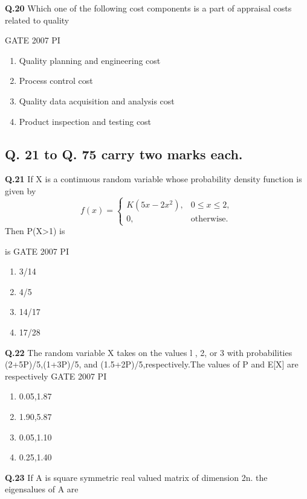 \documentclass[journal,12pt,onecolumn]{exam}
\theoremstyle{remark}
\begin{document}
            \noindent
            \textbf{Q.20}
            Which one of the following cost components is a part of appraisal costs related to quality


            \hfill{GATE 2007 PI}
            \begin{enumerate}
                \item Quality planning and engineering cost
                \item Process control cost
            
                 \item Quality data acquisition and analysis cost
                 \item Product inspection and testing cost
\end{enumerate}
\subsection{Q. 21 to Q. 75 carry two marks each.}

\noindent

\textbf{Q.21}
If X is a continuous random variable whose probability density function is given by
       \[
f(x) =
\begin{cases}
K(5x - 2x^2), & 0 \leq x \leq 2, \\
0, & \text{otherwise}.
\end{cases}
\]
 Then P(X>1) is
        
        
        
            is
            \hfill{GATE 2007 PI}
            \begin{enumerate}
                \item 3/14
                \item 4/5
                \item 14/17
                \item 17/28
            \end{enumerate}
            \noindent
            \textbf{Q.22}
            The random variable X takes on the values l , 2, or 3 with probabilities (2+5P)/5,(1+3P)/5, and (1.5+2P)/5,respectively.The values of P and E[X] are respectively
\hfill{GATE 2007 PI}

            \begin{enumerate}
                \item 0.05,1.87
                \item 1.90,5.87
                \item 0.05,1.10
                \item 0.25,1.40
            \end{enumerate}
            \noindent
            \textbf{Q.23}
           	If A is square symmetric real valued matrix of dimension 2n. the eigensalues of A are
\end{document}
